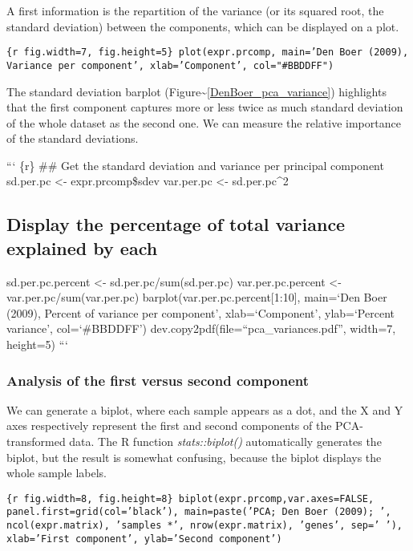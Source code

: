 A first information is the repartition of the variance (or its squared
root, the standard deviation) between the components, which can be
displayed on a plot.

\texttt{\{r fig.width=7, fig.height=5\} plot(expr.prcomp, main='Den Boer (2009),       Variance  per component', xlab='Component', col="\#BBDDFF")}

The standard deviation barplot
(Figure\textasciitilde{}\ref{DenBoer_pca_variance}) highlights that the
first component captures more or less twice as much standard deviation
of the whole dataset as the second one. We can measure the relative
importance of the standard deviations.

``` \{r\} \#\# Get the standard deviation and variance per principal
component sd.per.pc \textless{}- expr.prcomp\$sdev var.per.pc
\textless{}- sd.per.pc\^{}2

\subsection{Display the percentage of total variance explained by
each}\label{display-the-percentage-of-total-variance-explained-by-each}

sd.per.pc.percent \textless{}- sd.per.pc/sum(sd.per.pc)
var.per.pc.percent \textless{}- var.per.pc/sum(var.per.pc)
barplot(var.per.pc.percent{[}1:10{]}, main=`Den Boer (2009), Percent of
variance per component', xlab=`Component', ylab=`Percent variance',
col=`\#BBDDFF') dev.copy2pdf(file=``pca\_variances.pdf'', width=7,
height=5) ```

\subsubsection{Analysis of the first versus second
component}\label{analysis-of-the-first-versus-second-component}

We can generate a {biplot}, where each sample appears as a dot, and the
X and Y axes respectively represent the first and second components of
the PCA-transformed data. The R function \emph{stats::biplot()}
automatically generates the biplot, but the result is somewhat
confusing, because the biplot displays the whole sample labels.

\texttt{\{r fig.width=8, fig.height=8\} biplot(expr.prcomp,var.axes=FALSE,        panel.first=grid(col='black'),         main=paste('PCA; Den Boer (2009); ',        ncol(expr.matrix), 'samples *',         nrow(expr.matrix), 'genes', sep=' '),         xlab='First component', ylab='Second component')}

